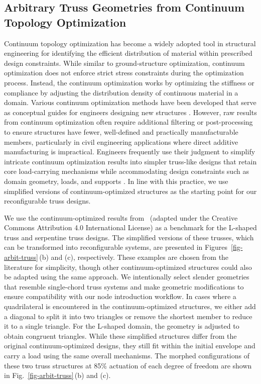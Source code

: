 \subsection{Arbitrary Truss Geometries from Continuum Topology Optimization}\label{02-subsec-ex-arbit}
Continuum topology optimization has become a widely adopted tool in structural engineering for identifying the efficient distribution of material within prescribed design constraints. While similar to ground-structure optimization, continuum optimization does not enforce strict stress constraints during the optimization process. Instead, the continuum optimization works by optimizing the stiffness or compliance by adjusting the distribution density of continuous material in a domain. Various continuum optimization methods have been developed that serve as conceptual guides for engineers designing new structures \citep{sigmund2013topology}. However, raw results from continuum optimization often require additional filtering or post-processing to ensure structures have fewer, well-defined and practically manufacturable members, particularly in civil engineering applications where direct additive manufacturing is impractical. Engineers frequently use their judgment to simplify intricate continuum optimization results into simpler truss-like designs that retain core load-carrying mechanisms while accommodating design constraints such as domain geometry, loads, and supports \citep{zegard2020continuum}. In line with this practice, we use simplified versions of continuum-optimized structures as the starting point for our reconfigurable truss designs.

We use the continuum-optimized results from~\cite{ullah2022topopt} (adapted under the Creative Commons Attribution 4.0 International License) as a benchmark for the L-shaped truss and serpentine truss designs. The simplified versions of these trusses, which can be transformed into reconfigurable systems, are presented in Figures~\ref{fig-arbit-truss}\,(b) and (c), respectively. These examples are chosen from the literature for simplicity, though other continuum-optimized structures could also be adapted using the same approach. We intentionally select slender geometries that resemble single-chord truss systems and make geometric modifications to ensure compatibility with our node introduction workflow. In cases where a quadrilateral is encountered in the continuum-optimized structures, we either add a diagonal to split it into two triangles or remove the shortest member to reduce it to a single triangle. For the L-shaped domain, the geometry is adjusted to obtain congruent triangles. While these simplified structures differ from the original continuum-optimized designs, they still fit within the initial envelope and carry a load using the same overall mechanisms. The morphed configurations of these two truss structures at 85\% actuation of each degree of freedom are shown in Fig.~\ref{fig-arbit-truss}\,(b) and (c).

